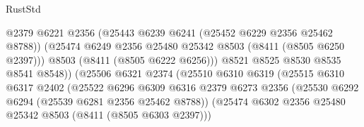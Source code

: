 \begin{lexlean}{RustStd}
\begin{coremodule}
                                              @2379
                                              @6221
                                              @2356
                                              (@25443 @6239 @6241 (@25452 @6229 @2356 @25462 @8788))
                                              (@25474
                                                @6249
                                                @2356
                                                @25480
                                                @25342
                                                @8503
                                                (@8411 (@8505 @6250 @2397)))
                                              @8503
                                              (@8411 (@8505 @6222 @6256)))
                                            @8521
                                            @8525
                                            @8530
                                            @8535
                                            @8541
                                            @8548))
                                        (@25506
                                          @6321
                                          @2374
                                          (@25510
                                            @6310
                                            @6319
                                            (@25515
                                              @6310
                                              @6317
                                              @2402
                                              (@25522
                                                @6296
                                                @6309
                                                @6316
                                                @2379
                                                @6273
                                                @2356
                                                (@25530
                                                  @6292
                                                  @6294
                                                  (@25539 @6281 @2356 @25462 @8788))
                                                (@25474
                                                  @6302
                                                  @2356
                                                  @25480
                                                  @25342
                                                  @8503
                                                  (@8411 (@8505 @6303 @2397)))

\end{coremodule}
\end{lexlean}
